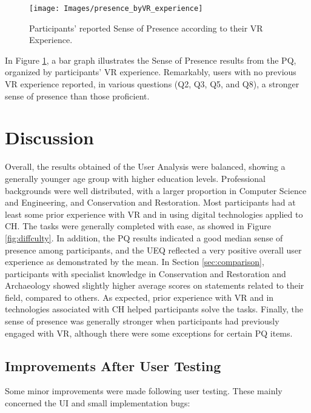 \begin{figure}[h!]
    \centering
    \texttt{[image: Images/presence\_byVR\_experience]}
    \caption{Participants’ reported Sense of Presence according to their \gls{VR} Experience.} 
    \label{fig:presence_byVR_experience}
\end{figure}


In Figure \ref{fig:presence_byVR_experience}, a bar graph illustrates the Sense of Presence results from the \gls{PQ}, organized by participants’ \gls{VR} experience. 
Remarkably, users with no previous \gls{VR} experience reported, in various questions (Q2, Q3, Q5, and Q8), a stronger sense of presence than those proficient.

\FloatBarrier
\section{Discussion}
\label{sec:eval_discussion}

Overall, the results obtained of the User Analysis were balanced, showing a generally younger age group with higher education levels. Professional backgrounds were well distributed, with a larger proportion in Computer Science and Engineering, and Conservation and Restoration.
Most participants had at least some prior experience with \gls{VR} and in using digital technologies applied to \gls{CH}. The tasks were generally completed with ease, as showed in Figure \ref{fig:diffculty}. In addition, the \gls{PQ} results indicated a good median sense of presence among participants, and the \gls{UEQ} reflected a very positive overall user experience as demonstrated by the mean.
In Section \ref{sec:comparison}, participants with specialist knowledge in Conservation and Restoration and Archaeology showed slightly higher average scores on statements related to their field, compared to others. As expected, prior experience with \gls{VR} and in technologies associated with \gls{CH} helped participants solve the tasks.
Finally, the sense of presence was generally stronger when participants had previously engaged with \gls{VR}, although there were some exceptions for certain \gls{PQ} items.

\subsection{Improvements After User Testing}
\label{sec:improvements}

Some minor improvements were made following user testing. These mainly concerned the \gls{UI} and small implementation bugs:

